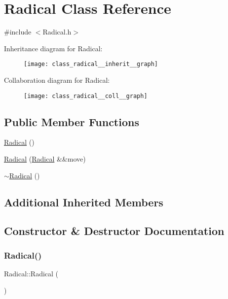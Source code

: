 \hypertarget{class_radical}{}\section{Radical Class Reference}
\label{class_radical}


{\ttfamily \#include $<$Radical.\+h$>$}



Inheritance diagram for Radical\+:
\nopagebreak
\begin{figure}[H]
\begin{center}
\leavevmode
\texttt{[image: class\_radical\_\_inherit\_\_graph]}
\end{center}
\end{figure}


Collaboration diagram for Radical\+:
\nopagebreak
\begin{figure}[H]
\begin{center}
\leavevmode
\texttt{[image: class\_radical\_\_coll\_\_graph]}
\end{center}
\end{figure}
\subsection*{Public Member Functions}
\begin{DoxyCompactItemize}
\item 
\mbox{\hyperlink{class_radical_a6d7ba1f6caa4278a4209a8912030b5f2}{Radical}} ()
\item 
\mbox{\hyperlink{class_radical_a4712deacbaf8409734cacbf8e40fd91d}{Radical}} (\mbox{\hyperlink{class_radical}{Radical}} \&\&move)
\item 
\mbox{\hyperlink{class_radical_aca224836812f74dca7e4948bfa7ddf33}{$\sim$\+Radical}} ()
\end{DoxyCompactItemize}
\subsection*{Additional Inherited Members}


\subsection{Constructor \& Destructor Documentation}
\mbox{\label{class_radical_a6d7ba1f6caa4278a4209a8912030b5f2}} 
\subsubsection{\texorpdfstring{Radical()}{Radical()}\hspace{0.1cm}{\footnotesize\ttfamily [1/2]}}
{\footnotesize\ttfamily Radical\+::\+Radical (\begin{DoxyParamCaption}{ }\end{DoxyParamCaption})}

